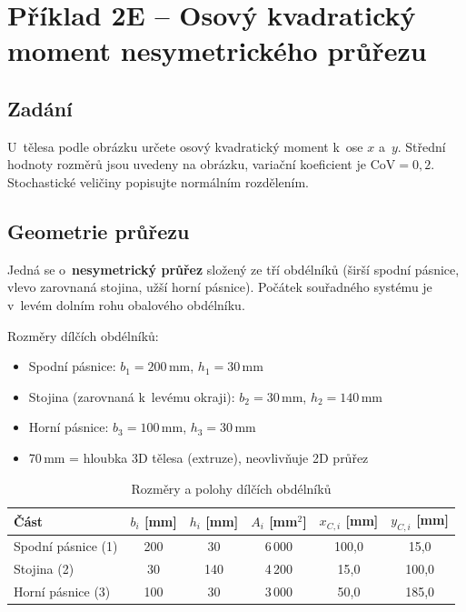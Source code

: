 \documentclass[a4paper,11pt]{article}
\newcommand{\unit}[1]{\,\mathrm{#1}}
\begin{document}
\newpage
\section{Příklad 2E -- Osový kvadratický moment nesymetrického průřezu}

\subsection{Zadání}

U~tělesa podle obrázku určete osový kvadratický moment k~ose $x$ a~$y$. Střední hodnoty rozměrů jsou uvedeny na obrázku, variační koeficient je $\mathrm{CoV} = 0{,}2$. Stochastické veličiny popisujte normálním rozdělením.

\subsection{Geometrie průřezu}

Jedná se o~\textbf{nesymetrický průřez} složený ze tří obdélníků (širší spodní pásnice, vlevo zarovnaná stojina, užší horní pásnice). Počátek souřadného systému je v~levém dolním rohu obalového obdélníku.

\medskip\noindent
Rozměry dílčích obdélníků:
\begin{itemize}[nosep]
    \item Spodní pásnice: $b_1 = 200\unit{mm}$, $h_1 = 30\unit{mm}$
    \item Stojina (zarovnaná k~levému okraji): $b_2 = 30\unit{mm}$, $h_2 = 140\unit{mm}$
    \item Horní pásnice: $b_3 = 100\unit{mm}$, $h_3 = 30\unit{mm}$
    \item 70\,mm = hloubka 3D tělesa (extruze), neovlivňuje 2D průřez
\end{itemize}

\begin{table}[H]
\centering
\caption{Rozměry a polohy dílčích obdélníků}
\begin{tabular}{lccccc}
\toprule
\textbf{Část} & $b_i$ [mm] & $h_i$ [mm] & $A_i$ [mm$^2$] & $x_{C,i}$ [mm] & $y_{C,i}$ [mm] \\
\midrule
Spodní pásnice (1) & 200 & 30 & 6\,000 & 100{,}0 & 15{,}0 \\
Stojina (2) & 30 & 140 & 4\,200 & 15{,}0 & 100{,}0 \\
Horní pásnice (3) & 100 & 30 & 3\,000 & 50{,}0 & 185{,}0 \\
\bottomrule
\end{tabular}
\end{table}
\end{document}

